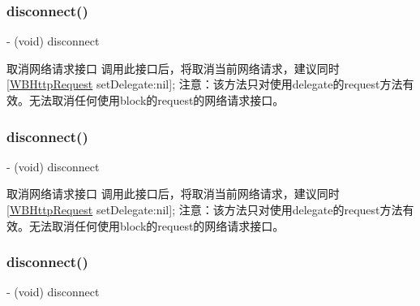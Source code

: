 \subsubsection{\texorpdfstring{disconnect()}{disconnect()}\hspace{0.1cm}{\footnotesize\ttfamily [1/3]}}
{\footnotesize\ttfamily -\/ (void) disconnect \begin{DoxyParamCaption}{ }\end{DoxyParamCaption}}

取消网络请求接口 调用此接口后，将取消当前网络请求，建议同时\mbox{[}\mbox{\hyperlink{interface_w_b_http_request}{W\+B\+Http\+Request}} set\+Delegate\+:nil\mbox{]}; 注意：该方法只对使用delegate的request方法有效。无法取消任何使用block的request的网络请求接口。 \mbox{\label{interface_w_b_http_request_a387faed5b06844181d05a6de71d05932}} 
\subsubsection{\texorpdfstring{disconnect()}{disconnect()}\hspace{0.1cm}{\footnotesize\ttfamily [2/3]}}
{\footnotesize\ttfamily -\/ (void) disconnect \begin{DoxyParamCaption}{ }\end{DoxyParamCaption}}

取消网络请求接口 调用此接口后，将取消当前网络请求，建议同时\mbox{[}\mbox{\hyperlink{interface_w_b_http_request}{W\+B\+Http\+Request}} set\+Delegate\+:nil\mbox{]}; 注意：该方法只对使用delegate的request方法有效。无法取消任何使用block的request的网络请求接口。 \mbox{\label{interface_w_b_http_request_a387faed5b06844181d05a6de71d05932}} 
\subsubsection{\texorpdfstring{disconnect()}{disconnect()}\hspace{0.1cm}{\footnotesize\ttfamily [3/3]}}
{\footnotesize\ttfamily -\/ (void) disconnect \begin{DoxyParamCaption}{ }\end{DoxyParamCaption}}

